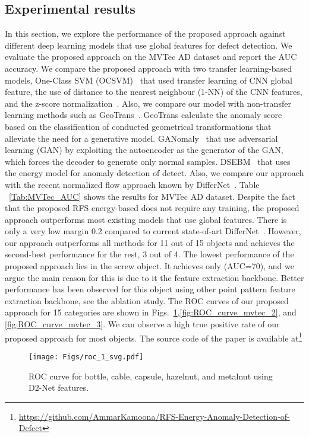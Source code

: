 \documentclass[journal]{IEEEtran}
\let\MYoriglatexcaption\caption
\renewcommand{\caption}[2][\relax]{\MYoriglatexcaption[#2]{#2}}
\begin{document}
\subsection{Experimental results}
In this section, we explore the performance of the proposed approach against different deep learning models that use global features for defect detection. We evaluate the proposed approach on the MVTec AD dataset and report the AUC accuracy. We compare the proposed approach with two transfer learning-based models, One-Class SVM (OCSVM)~\cite{andrews} that used transfer learning of CNN global feature, the use of distance to the nearest neighbour (1-NN) of the CNN features, and the z-score normalization~\cite{nazare}. Also, we compare our model with non-transfer learning methods such as GeoTrans~\cite{geotrans}. GeoTrans calculate the anomaly score based on the classification of conducted geometrical transformations that alleviate the need for a generative model. GANomaly~\cite{akcay2018ganomaly} that use adversarial learning (GAN) by exploiting the autoencoder as the generator of the GAN, which forces the decoder to generate only normal samples. DSEBM~\cite{dsebm} that uses the energy model for anomaly detection of detect. Also, we compare our approach with the recent normalized flow approach known by DifferNet~\cite{rudolph2021same}. Table ~\ref{Tab:MVTec_AUC} shows the results for MVTec AD dataset. Despite the fact that the proposed RFS energy-based does not require any training, the proposed approach outperforms most existing models that use global features. There is only a very low margin 0.2 compared to current state-of-art DifferNet~\cite{rudolph2021same}. However, our approach outperforms all methods for 11 out of 15 objects and achieves the second-best performance for the rest, 3 out of 4. The lowest performance of the proposed approach lies in the screw object. It achieves only (AUC=70), and we argue the main reason for this is due to it the feature extraction backbone. Better performance has been observed for this object using other point pattern feature extraction backbone, see the ablation study. The ROC curves of our proposed approach for 15 categories are shown in Figs.~\ref{fig:ROC_curve_mvtec_1},\ref{fig:ROC_curve_mvtec_2}, and \ref{fig:ROC_curve_mvtec_3}. We can observe a high true positive rate of our proposed approach for most objects. The source code of the paper is available at\footnote{ \url{https://github.com/AmmarKamoona/RFS-Energy-Anomaly-Detection-of-Defect}}
\begin{figure}[!ht]
    \centering
    \texttt{[image: Figs/roc\_1\_svg.pdf]}
    \caption{ROC curve for bottle, cable, capsule, hazelnut, and metalnut using D2-Net features.}
    \label{fig:ROC_curve_mvtec_1}
\end{figure}    
\end{document}
